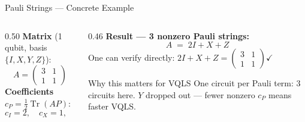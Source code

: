 \documentclass{beamer}
\begin{document}
\begin{frame}[shrink=5]{Pauli Strings — Concrete Example}

  \begin{columns}[T]
    \begin{column}{0.50\textwidth}
      \textbf{Matrix} (1 qubit, basis $\{I,X,Y,Z\}$):
      \[
        A = \begin{pmatrix}3 & 1 \\ 1 & 1\end{pmatrix}
      \]
      \textbf{Coefficients} $c_P = \tfrac{1}{2}\operatorname{Tr}(AP)$:
      \[
        c_I=2,\quad c_X=1,\quad c_Y=0,\quad c_Z=1.
      \]
    \end{column}
    \begin{column}{0.46\textwidth}
      \textbf{Result — 3 nonzero Pauli strings:}
      \[ A \;=\; 2I + X + Z \]
      One can verify directly: $2I+X+Z = \begin{pmatrix}3&1\\1&1\end{pmatrix}\checkmark$
      \begin{block}{Why this matters for VQLS}
        \small One circuit per Pauli term: 3 circuits here.
        $Y$ dropped out — fewer nonzero $c_P$ means faster VQLS.
      \end{block}
    \end{column}
  \end{columns}
\end{frame}
\end{document}
